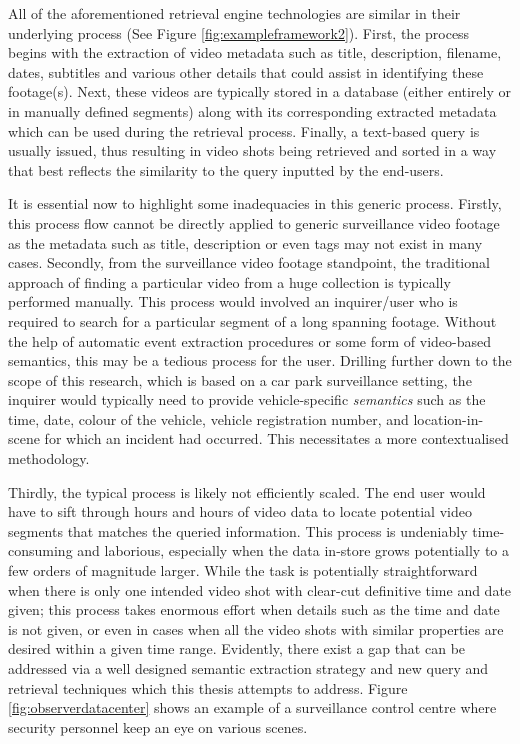 All of the aforementioned retrieval engine technologies are similar 
in their underlying process (See Figure \ref{fig:exampleframework2}). First, the process begins with the extraction of video metadata such as title, description, filename, dates, subtitles and various other details that could assist in identifying these footage(s). Next, these videos are typically stored in a database (either entirely or in manually defined segments) along with its corresponding extracted metadata which can be used during the retrieval process. Finally, a text-based query is usually issued, thus resulting in video shots being retrieved and sorted in a way that best 
reflects the similarity to
the query inputted by the end-users.

It is essential now to highlight some inadequacies in this generic process. Firstly, this process flow cannot be directly applied to generic surveillance video footage as the metadata such as title, description or even tags may not exist in many cases.
Secondly, from the surveillance video footage standpoint, the traditional approach of finding a particular video from a huge collection is typically performed manually. This process would involved an inquirer/user who is required to search for a particular segment of a long spanning footage. Without the help of automatic event extraction procedures or some form of video-based semantics, this may be a tedious process for the user. 
Drilling further down to the scope of this research, which is based on a car park surveillance setting, the inquirer would typically need to provide vehicle-specific \textit{semantics} such as the time, date, colour of the vehicle, vehicle registration number, and location-in-scene for which an incident had occurred. This necessitates a more contextualised methodology. %

Thirdly, the typical process is likely not efficiently scaled. The end user would have to sift through hours and hours of video data to locate potential video segments that matches the queried information. This %
process is undeniably time-consuming and laborious, especially when the data in-store grows potentially to a few orders of magnitude larger. While the task is potentially straightforward when there is only one intended video shot with clear-cut definitive time and date given; this process takes enormous effort when details such as the time and date is not given, or even in cases when all the video shots with similar properties are desired within a given time range. Evidently, there exist a gap that can be addressed 
via a well designed semantic extraction strategy and new query and retrieval techniques which this thesis attempts to address. Figure \ref{fig:observerdatacenter} shows an example of a surveillance control centre where security personnel keep an eye on various scenes. 

